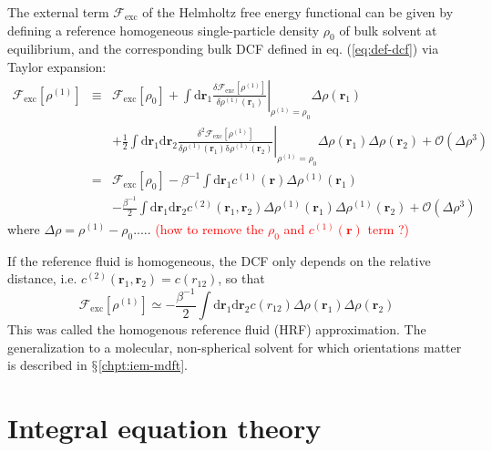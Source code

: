 The external term $\mathcal{F}_{\mathrm{exc}}$ of the Helmholtz free
energy functional can be given by defining a reference homogeneous
single-particle density $\rho_{0}$ of bulk solvent at equilibrium,
and the corresponding bulk \acs{DCF} defined in eq. (\ref{eq:def-dcf})
via Taylor expansion:
\begin{eqnarray}
\mathcal{F}_{\mathrm{exc}}\left[\rho^{(1)}\right] & \equiv & \mathcal{F}_{\mathrm{exc}}\left[\rho_{0}\right]+\int\mathrm{d}\mathbf{r}_{1}\left.\frac{\delta\mathcal{F}_{\mathrm{exc}}\left[\rho^{(1)}\right]}{\delta\rho^{(1)}(\mathbf{r}_{1})}\right|_{\rho^{(1)}=\rho_{0}}\Delta\rho(\mathbf{r}_{1})\nonumber \\
 &  & +\frac{1}{2}\int\mathrm{d}\mathbf{\mathbf{r}}_{1}\mathrm{d}\mathbf{r}_{2}\left.\frac{\delta^{2}\mathcal{F}_{\mathrm{exc}}\left[\rho^{(1)}\right]}{\delta\rho^{(1)}(\mathbf{r}_{1})\mathrm{\delta}\rho^{(1)}(\mathbf{r}_{2})}\right|_{\rho^{(1)}=\rho_{0}}\Delta\rho(\mathbf{r}_{1})\Delta\rho(\mathbf{r}_{2})+\mathcal{O}(\Delta\rho^{3})\\
 & = & \mathcal{F}_{\mathrm{exc}}\left[\rho_{0}\right]-\beta^{-1}\int\mathrm{d}\mathbf{r}_{1}c^{(1)}(\mathbf{r})\Delta\rho^{(1)}(\mathbf{r}_{1})\nonumber \\
 &  & -\frac{\beta^{-1}}{2}\int\mathrm{d}\mathbf{\mathbf{r}}_{1}\mathrm{d}\mathbf{r}_{2}c^{(2)}(\mathbf{r}_{1},\mathbf{r}_{2})\Delta\rho^{(1)}(\mathbf{r}_{1})\Delta\rho^{(1)}(\mathbf{r}_{2})+\mathcal{O}(\Delta\rho{}^{3})
\end{eqnarray}
where $\Delta\rho=\rho^{(1)}-\rho_{0}$.....\textcolor{red}{{} (how
to remove the $\rho_{0}$ and $c^{(1)}(\mathbf{r})$ term ?)}

If the reference fluid is homogeneous, the DCF only depends on the
relative distance, i.e. $c^{(2)}(\mathbf{r}_{1},\mathbf{r}_{2})=c(r_{12})$,
so that
\begin{equation}
\mathcal{F}_{\mathrm{exc}}\left[\rho^{(1)}\right]\simeq-\frac{\beta^{-1}}{2}\int\mathrm{d}\mathbf{\mathbf{r}}_{1}\mathrm{d}\mathbf{r}_{2}c(r_{12})\Delta\rho(\mathbf{r}_{1})\Delta\rho(\mathbf{r}_{2})
\end{equation}
This was called the homogenous reference fluid (\acs{HRF}) approximation.
The generalization to a molecular, non-spherical solvent for which
orientations matter is described in $\mathsection$\ref{chpt:iem-mdft}.

\section{Integral equation theory}

